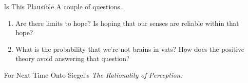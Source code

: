 \documentclass[
  17pt,
  letterpaper,
  ignorenonframetext,
  aspectratio=169,
]{beamer}
\providecommand{\tightlist}{%
  \setlength{\itemsep}{0pt}\setlength{\parskip}{0pt}}\usepackage{longtable,booktabs,array}
\begin{document}
\begin{frame}{Is This Plausible}
\protect\hypertarget{is-this-plausible}{}
A couple of questions.

\begin{enumerate}[<+->]
\tightlist
\item
  Are there limits to hope? Is hoping that our senses are reliable
  within that hope?
\item
  What is the probability that we're not brains in vats? How does the
  positive theory avoid answering that question?
\end{enumerate}
\end{frame}

\begin{frame}{For Next Time}
\protect\hypertarget{for-next-time}{}
Onto Siegel's \emph{The Rationality of Perception}.
\end{frame}
\end{document}

